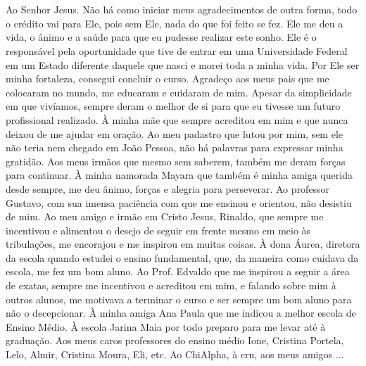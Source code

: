 
\section*{}

Ao Senhor Jesus. Não há como iniciar meus agradecimentos de outra forma, todo o crédito vai para Ele, pois sem Ele, nada do que foi feito se fez. Ele me deu a vida, o ânimo e a saúde para que eu pudesse realizar este sonho. Ele é o responsável pela oportunidade que tive de entrar em uma Universidade Federal em um Estado diferente daquele que nasci e morei toda a minha vida. Por Ele ser minha fortaleza, consegui concluir o curso.
Agradeço aos meus pais que me colocaram no mundo, me educaram e cuidaram de mim. Apesar da simplicidade em que vivíamos, sempre deram o melhor de si para que eu tivesse um futuro profissional realizado. À minha mãe que sempre acreditou em mim e que nunca deixou de me ajudar em oração. Ao meu padastro que lutou por mim, sem ele não teria nem chegado em João Pessoa, não há palavras para expressar minha gratidão. Aos meus irmãos que mesmo sem saberem, também me deram forças para continuar. À minha namorada Mayara que também é minha amiga querida desde sempre, me deu ânimo, forças e alegria para perseverar.
Ao professor Gustavo, com sua imensa paciência com que me ensinou e orientou, não desistiu de mim.
Ao meu amigo e irmão em Cristo Jesus, Rinaldo, que sempre me incentivou e alimentou o desejo de seguir em frente mesmo em meio às tribulações, me encorajou e me inspirou em muitas coisas.
À dona Áurea, diretora da escola quando estudei o ensino fundamental, que, da maneira como cuidava da escola, me fez um bom aluno.
Ao Prof. Edvaldo que me inspirou a seguir a área de exatas, sempre me incentivou e acreditou em mim, e falando sobre mim à outros alunos, me motivava a terminar o curso e ser sempre um bom aluno para não o decepcionar. À minha amiga Ana Paula que me indicou a melhor escola de Ensino Médio. À escola Jarina Maia por todo preparo para me levar até à graduação. Aos meus caros professores do ensino médio Ione, Cristina Portela, Lelo, Almir, Cristina Moura, Eli, etc.
Ao ChiAlpha, à cru, aos meus amigos ...
